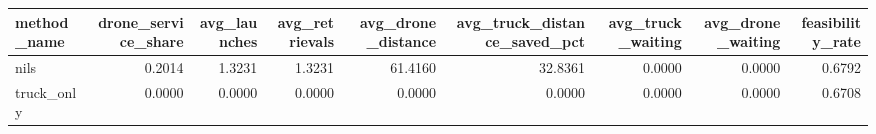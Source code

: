 \begin{tabular}{lrrrrrrrr}
\toprule
method_name & drone_service_share & avg_launches & avg_retrievals & avg_drone_distance & avg_truck_distance_saved_pct & avg_truck_waiting & avg_drone_waiting & feasibility_rate \\
\midrule
nils & 0.2014 & 1.3231 & 1.3231 & 61.4160 & 32.8361 & 0.0000 & 0.0000 & 0.6792 \\
truck_only & 0.0000 & 0.0000 & 0.0000 & 0.0000 & 0.0000 & 0.0000 & 0.0000 & 0.6708 \\
\bottomrule
\end{tabular}
